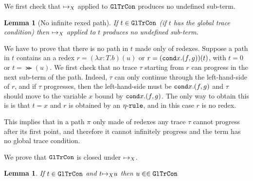 \documentclass{article}
\newtheorem{lemma}[theorem]{Lemma}
\newenvironment{proof}[1][Proof]{\begin{trivlist}
\item[\hskip \labelsep {\bfseries #1}]}{\end{trivlist}}
\begin{document}
We first check that ${\mapsto}_X$ applied to ${\tt GlTrCon}$ produces no undefined sub-term.

\begin{lemma}[No infinite rexed path]
If $t \in {\tt GlTrCon}$ (if $t$ has the global trace condition)
then ${\mapsto}_X$ applied to $t$ produces no undefined sub-term.
\end{lemma}

\begin{proof}
We have to prove that there is no path in $t$ made only of redexes.
Suppose a path in $t$ contains an a redex $r=(\lambda x:T.b)(u)$ or
$r=({\tt cond} x.(f,g))(t)$, with $t=0$ or $t=\Succ(u)$. 
We first check that no trace $\tau$ starting from $r$ can progress in the next sub-term of the path.
Indeed, $\tau$ can only continue through the left-hand-side of $r$,
and if $\tau$ progresses, then the left-hand-side must be ${\tt cond} x.(f,g)$ and $\tau$
should move to the variable $x$ bound by ${\tt cond} x.(f,g)$. The only way to obtain
this is  is that $t=x$ and $r$ is obtained by an ${\eta\mbox{-}\tt rule}$,
and in this case $r$ is no redex.

This implies that in a path $\pi$ only made of redexes any trace $\tau$ 
cannot progress after its first point, and therefore it cannot infinitely progress and the term has
no global trace condition.
\end{proof}


We prove that ${\tt GlTrCon}$ is closed under ${\mapsto}_X$.


\begin{lemma}
If $t \in {\tt GlTrCon}$ and $t {\mapsto}_X u$ then $u \in \in {\tt GlTrCon}$
\end{lemma}
\end{document}
